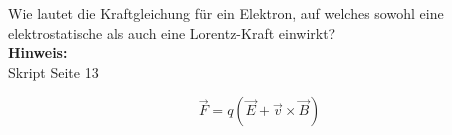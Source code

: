 \begin{question}[section=2,name={Kraftgleichung},difficulty=,quantity=5,type=thr,tags={20160310}]
	Wie lautet die Kraftgleichung für ein Elektron, auf welches sowohl eine elektrostatische als auch eine Lorentz-Kraft einwirkt?
	\\ \textbf{Hinweis:}\\
	Skript Seite 13
\end{question}
\begin{solution}
	\begin{equation}
	\vec{F} = q \left( \vec{E} + \vec{v} \times \vec{B} \right)
\end{equation}
\end{solution}